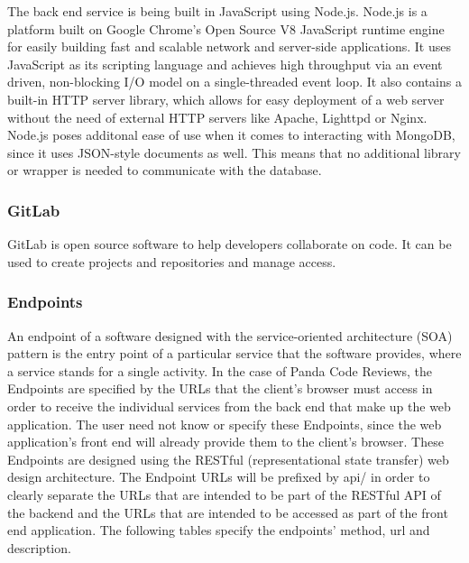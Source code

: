 The back end service is being built in JavaScript using Node.js. Node.js is a
platform built on Google Chrome's Open Source V8 JavaScript runtime engine for
easily building fast and scalable network and server-side applications. It uses
JavaScript as its scripting language and achieves high throughput via an event
driven, non-blocking I/O model on a single-threaded event loop. It also contains
a built-in HTTP server library, which allows for easy deployment of a web server
without the need of external HTTP servers like Apache, Lighttpd or Nginx.
Node.js poses additonal ease of use when it comes to interacting with MongoDB,
since it uses JSON-style documents as well. This means that no additional
library or wrapper is needed to communicate with the database.

\subsubsection{GitLab}

GitLab is open source software to help developers collaborate on code. It can be
used to create projects and repositories and manage access.

\subsubsection{Endpoints}

An endpoint of a software designed with the service-oriented architecture (SOA)
pattern is the entry point of a particular service that the software provides,
where a service stands for a single activity. In the case of Panda Code Reviews,
the Endpoints are specified by the URLs that the client's browser must access in
order to receive the individual services from the back end that make up the web
application. The user need not know or specify these Endpoints, since the web
application's front end will already provide them to the client's browser. These
Endpoints are designed using the RESTful (representational state transfer) web
design architecture. The Endpoint URLs will be prefixed by api/ in order to
clearly separate the URLs that are intended to be part of the RESTful API of the
backend and the URLs that are intended to be accessed as part of the front end
application. The following tables specify the endpoints' method, url and
description.

